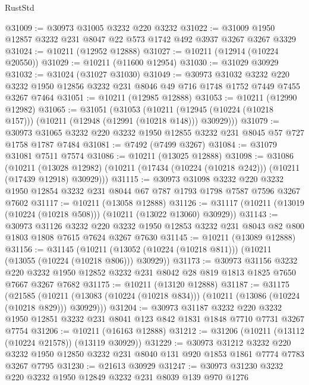 \begin{lexlean}{RustStd}
\begin{coremodule}
@31009 := @30973 @31005 @3232 @220 @3232
@31022 := @31009 @1950 @12857 @3232 @231 @8047 @22 @573 @1742 @492 @3937 @3267 @3267 @3329
@31024 := @10211 (@12952 @12888)
@31027 := @10211 (@12914 (@10224 @20550))
@31029 := @10211 (@11600 @12954)
@31030 := @31029 @30929
@31032 := @31024 (@31027 @31030)
@31049 := @30973
    @31032
    @3232
    @220
    @3232
    @1950
    @12856
    @3232
    @231
    @8046
    @49
    @716
    @1748
    @1752
    @7449
    @7455
    @3267
    @7464
@31051 := @10211 (@12985 @12888)
@31053 := @10211 (@12990 @12982)
@31065 := @31051
    (@31053
      (@10211 (@12945 (@10224 (@10218 @157))) (@10211 (@12948 (@12991 (@10218 @148))) @30929)))
@31079 := @30973 @31065 @3232 @220 @3232 @1950 @12855 @3232 @231 @8045 @57 @727 @1758 @1787 @7484
@31081 := @7492 (@7499 @3267)
@31084 := @31079 @31081 @7511 @7574
@31086 := @10211 (@13025 @12888)
@31098 := @31086
    (@10211
      (@13028 @12982)
      (@10211 (@17434 (@10224 (@10218 @242))) (@10211 (@17439 @12918) @30929)))
@31115 := @30973
    @31098
    @3232
    @220
    @3232
    @1950
    @12854
    @3232
    @231
    @8044
    @67
    @787
    @1793
    @1798
    @7587
    @7596
    @3267
    @7602
@31117 := @10211 (@13058 @12888)
@31126 := @31117 (@10211 (@13019 (@10224 (@10218 @508))) (@10211 (@13022 @13060) @30929))
@31143 := @30973
    @31126
    @3232
    @220
    @3232
    @1950
    @12853
    @3232
    @231
    @8043
    @82
    @800
    @1803
    @1808
    @7615
    @7624
    @3267
    @7630
@31145 := @10211 (@13089 @12888)
@31156 := @31145
    (@10211 (@13052 (@10224 (@10218 @811))) (@10211 (@13055 (@10224 (@10218 @806))) @30929))
@31173 := @30973
    @31156
    @3232
    @220
    @3232
    @1950
    @12852
    @3232
    @231
    @8042
    @28
    @819
    @1813
    @1825
    @7650
    @7667
    @3267
    @7682
@31175 := @10211 (@13120 @12888)
@31187 := @31175
    (@21585
      (@10211 (@13083 (@10224 (@10218 @834))) (@10211 (@13086 (@10224 (@10218 @829))) @30929)))
@31204 := @30973
    @31187
    @3232
    @220
    @3232
    @1950
    @12851
    @3232
    @231
    @8041
    @123
    @842
    @1831
    @1848
    @7710
    @7731
    @3267
    @7754
@31206 := @10211 (@16163 @12888)
@31212 := @31206 (@10211 (@13112 (@10224 @21578)) (@13119 @30929))
@31229 := @30973
    @31212
    @3232
    @220
    @3232
    @1950
    @12850
    @3232
    @231
    @8040
    @131
    @920
    @1853
    @1861
    @7774
    @7783
    @3267
    @7795
@31230 := @21613 @30929
@31247 := @30973
    @31230
    @3232
    @220
    @3232
    @1950
    @12849
    @3232
    @231
    @8039
    @139
    @970
    @1276

\end{coremodule}
\end{lexlean}
